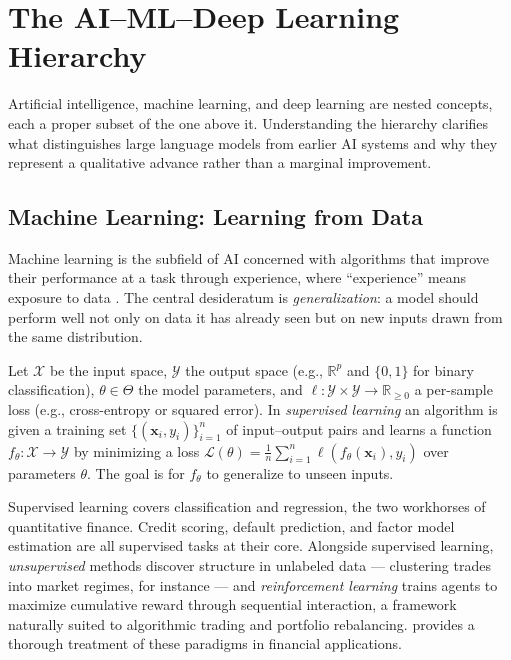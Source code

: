 \section{The AI--ML--Deep Learning Hierarchy}
\label{sec:ai-ml-dl-hierarchy}

Artificial intelligence, machine learning, and deep learning are nested
concepts, each a proper subset of the one above it.  Understanding the
hierarchy clarifies what distinguishes large language models from earlier
AI systems and why they represent a qualitative advance rather than a
marginal improvement.

\subsection{Machine Learning: Learning from Data}
\label{subsec:ml-from-data}

Machine learning is the subfield of AI concerned with algorithms that
improve their performance at a task through experience, where ``experience''
means exposure to data \parencite{goodfellow2016deep}.  The central
desideratum is \emph{generalization}: a model should perform well not only
on data it has already seen but on new inputs drawn from the same
distribution.

\begin{definition}
\label{def:supervised-learning}
Let $\mathcal{X}$ be the input space, $\mathcal{Y}$ the output space (e.g., $\mathbb{R}^p$ and $\{0,1\}$ for binary classification), $\theta \in \Theta$ the model parameters, and $\ell: \mathcal{Y}\times\mathcal{Y}\to\mathbb{R}_{\geq 0}$ a per-sample loss (e.g., cross-entropy or squared error).
In \emph{supervised learning} an algorithm is given a training set
$\{(\mathbf{x}_i, y_i)\}_{i=1}^n$ of input--output pairs and learns a
function $f_\theta : \mathcal{X} \to \mathcal{Y}$ by minimizing a loss
$\mathcal{L}(\theta) = \frac{1}{n}\sum_{i=1}^n \ell(f_\theta(\mathbf{x}_i), y_i)$
over parameters $\theta$.  The goal is for $f_\theta$ to generalize to
unseen inputs.
\end{definition}

Supervised learning covers classification and regression, the two workhorses
of quantitative finance.  Credit scoring, default prediction, and factor
model estimation are all supervised tasks at their core.  Alongside
supervised learning, \emph{unsupervised} methods discover structure in
unlabeled data --- clustering trades into market regimes, for instance ---
and \emph{reinforcement learning} trains agents to maximize cumulative reward
through sequential interaction, a framework naturally suited to algorithmic
trading and portfolio rebalancing.  \textcite{lopezdeprado2018advances}
provides a thorough treatment of these paradigms in financial applications.

